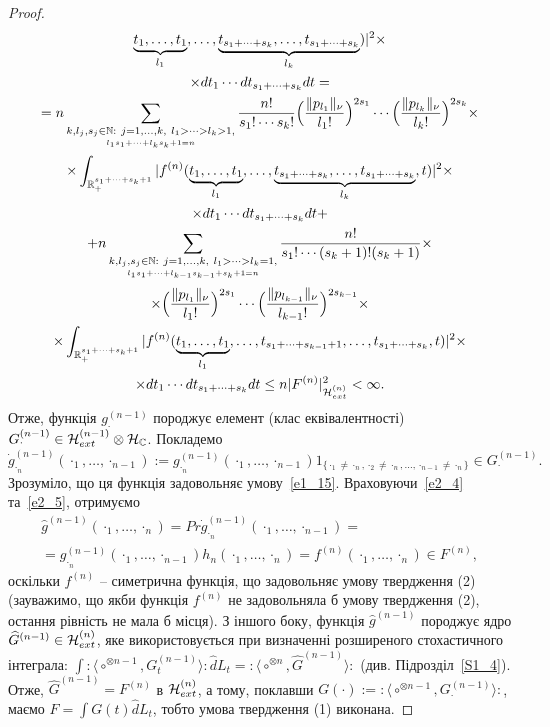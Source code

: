 \begin{proof}
\begin{equation}
\begin{gathered}
\underset{l_1}{\underbrace{t_1,\dots,t_1}},\dots,
\underset{l_k}{\underbrace{t_{s_1+\cdots+s_k},\dots,t_{s_1+\cdots+s_k}}})|^2\times\\
\times dt_1\cdots dt_{s_1+\cdots+s_k}dt=\\
=n\sum_{\underset{l_1s_1+\cdots+l_ks_k+1=n}{k,l_j,s_j\in\mathbb{N}:
\ j=1,\dots,k,\ l_1>\cdots>l_k>1,}}
\frac{n!}{s_1!\cdots s_k!}\Big(\frac{\|p_{l_1}\|_\nu}{l_1!}\Big)^{2s_1}
\cdots\Big(\frac{\|p_{l_k}\|_\nu}{l_k!}\Big)^{2s_k}\times\\
\times\int_{\mathbb{R}_+^{s_1+\cdots+s_k+1}}|f^{(n)}(
\underset{l_1}{\underbrace{t_1,\dots,t_1}},\dots,
\underset{l_k}{\underbrace{t_{s_1+\cdots+s_k},\dots,
t_{s_1+\cdots+s_k}}},t)|^2\times\\
\times dt_1\cdots dt_{s_1+\cdots+s_k}dt+\\
+n\sum_{\underset{l_1s_1+\cdots+l_{k-1}s_{k-1}+s_k+1=n}{k,l_j,s_j\in\mathbb{N}:
\ j=1,\dots,k,\ l_1>\cdots>l_k=1,}}\frac{n!}{s_1!\cdots (s_k+1)!(s_k+1)}\times\\
\times\Big(\frac{\|p_{l_1}\|_\nu}{l_1!}\Big)^{2s_1}
\cdots\Big(\frac{\|p_{l_{k-1}}\|_\nu}{l_{k-1}!}\Big)^{2s_{k-1}}\times\\
\times\int_{\mathbb{R}_+^{s_1+\cdots+s_k+1}}|f^{(n)}(
\underset{l_1}{\underbrace{t_1,\dots,t_1}},\dots,
t_{s_1+\cdots+s_{k-1}+1},\dots,t_{s_1+\cdots+s_k},t)|^2\times\\
\times dt_1\cdots dt_{s_1+\cdots+s_k}dt
\leq n|F^{(n)}|_{\mathcal{H}_{ext}^{(n)}}^2<\infty.
\end{gathered}
\end{equation}
Отже, функція $g^{(n-1)}_\cdot$ породжує елемент (клас еквівалентності)
$G^{(n-1)}_\cdot\in\mathcal{H}_{ext}^{(n-1)}\otimes\mathcal{H}_{\mathbb{C}}$.
Покладемо
\begin{equation*}
\dot g^{(n-1)}_{\cdot_n}(\cdot_1,\dots,\cdot_{n-1})
:=g^{(n-1)}_{\cdot_n}(\cdot_1,\dots,\cdot_{n-1})
1_{\{\cdot_1\not=\cdot_n,\cdot_2\not=\cdot_n,\dots,\cdot_{n-1}\not=\cdot_n\}}
\in G^{(n-1)}_\cdot.
\end{equation*}
Зрозуміло, що ця функція задовольняє умову~\eqref{e1_15}. Враховуючи~\eqref{e2_4}
та~\eqref{e2_5}, отримуємо
\begin{gather*}
\widehat g^{(n-1)}(\cdot_1,\dots,\cdot_n)
=Pr\dot g^{(n-1)}_{\cdot_n}(\cdot_1,\dots,\cdot_{n-1})=\\
=g^{(n-1)}_{\cdot_n}(\cdot_1,\dots,\cdot_{n-1})h_n(\cdot_1,\dots,\cdot_n)
=f^{(n)}(\cdot_1,\dots,\cdot_n)\in F^{(n)},
\end{gather*}
оскільки $f^{(n)}$ -- симетрична функція, що задовольняє умову твердження (2)
(зауважимо, що якби функція $f^{(n)}$ не задовольняла б умову твердження (2), остання рівність
не мала б місця). З іншого боку, функція $\widehat g^{(n-1)}$ породжує ядро
$\widehat G^{(n-1)}\in\mathcal{H}_{ext}^{(n)}$, яке використовується при визначенні розширеного
стохастичного інтеграла:
$\int{:\!\langle}\circ^{\otimes n-1},G^{(n-1)}_t{\rangle\!:}\widehat dL_t
={:\!\langle}\circ^{\otimes n},\widehat G^{(n-1)}{\rangle\!:}$
(див. Підрозділ~\ref{S1_4}). Отже, $\widehat G^{(n-1)}=F^{(n)}$ в
$\mathcal{H}_{ext}^{(n)}$, а тому, поклавши
$G(\cdot):={:\!\langle}\circ^{\otimes n-1},G^{(n-1)}_\cdot{\rangle\!:}$, маємо
$F=\int G(t)\widehat dL_t$, тобто умова твердження (1) виконана.


\end{proof}
